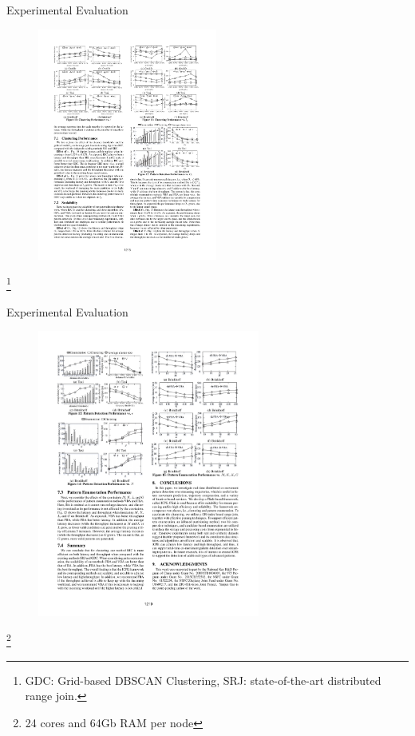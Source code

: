 \documentclass{beamer}
\newcommand\blfootnote[1]{%

  \begingroup

  \renewcommand\thefootnote{}\footnote{#1}%

  \addtocounter{footnote}{-1}%

  \endgroup

}
\begin{document}
\begin{frame}{Experimental Evaluation}
    \centering
    \begin{figure}
        \includegraphics[trim=1.8cm 17.15cm 11.5cm 2cm, clip, width=0.525\textwidth]{figures/Chen_p1218}
    \end{figure}
    \blfootnote{\tiny{GDC: Grid-based DBSCAN Clustering, SRJ: state-of-the-art distributed range join.}}
\end{frame}

\begin{frame}{Experimental Evaluation}
    \centering
    \begin{figure}
        \includegraphics[trim=1.8cm 12.5cm 11cm 8.5cm, clip, width=0.65\textwidth]{figures/Chen_p1219}
    \end{figure}
    \blfootnote{\tiny{24 cores and 64Gb RAM per node}}
\end{frame}
\end{document}
